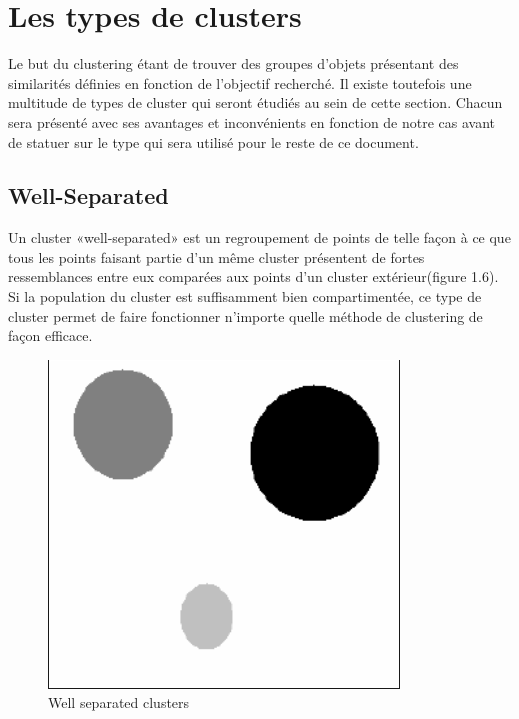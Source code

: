 \documentclass[memoire.tex]{subfiles}
\begin{document}
\section{Les types de clusters}

Le but du clustering étant de trouver des groupes d'objets présentant des similarités
définies en fonction de l'objectif recherché. Il existe toutefois une multitude de types de cluster qui seront étudiés au sein de cette section. Chacun sera présenté avec ses avantages et inconvénients en fonction de notre cas avant de statuer sur le type qui sera utilisé pour le reste de ce document.

\subsection{Well-Separated}
Un cluster «well-separated» est un regroupement de points de telle façon à ce que tous les points faisant partie d'un même cluster présentent de fortes ressemblances entre eux comparées aux points d'un cluster extérieur(figure 1.6). Si la population du cluster est suffisamment bien compartimentée, ce type de cluster permet de faire fonctionner n'importe quelle méthode de clustering de façon efficace.
	\begin{figure}[h!]
		\centerline{\includegraphics[scale=0.8]{img/well_separated.png}}
		\caption{Well separated clusters}
	\end{figure}
\end{document}
